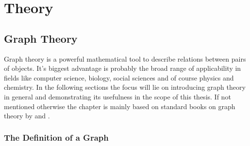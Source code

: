
\part{Theory}
\label{sec:theory}

\chapter{Graph Theory}
\label{sec:graphtheory}

Graph theory is a powerful mathematical tool to describe relations between
pairs of objects. It's biggest advantage is probably the broad range of
applicability in fields like computer science, biology, social sciences and of
course physics and chemistry. In the following sections the focus will lie on
introducing graph theory in general and demonstrating its usefulness in the
scope of this thesis. If not mentioned otherwise the chapter is mainly based on
standard books on graph theory by
\citeauthor{West_Introductiongraphtheory_2001}\autocite{West_Introductiongraphtheory_2001}
and
\citeauthor{Balakrishnan_Schaumoutlinetheory_1997}\autocite{Balakrishnan_Schaumoutlinetheory_1997}.

\section{The Definition of a Graph}
\label{sec:DefinitionGraph}

